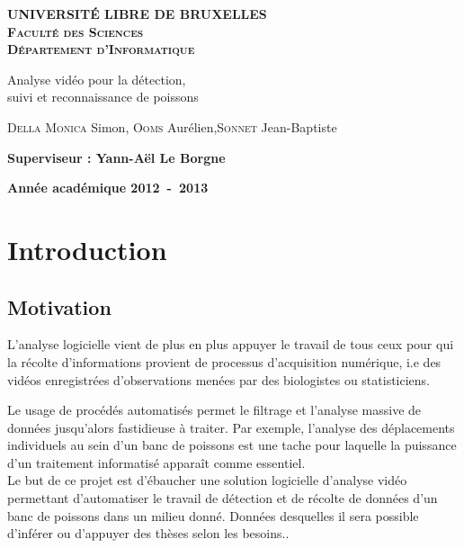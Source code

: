 \documentclass[a4paper,12pt]{report}
\begin{document}
\setlength\parindent{0pt} %


\begin{titlepage}
\begin{center}
\textbf{\textsc{UNIVERSIT\'E LIBRE DE BRUXELLES}}\\
\textbf{\textsc{Faculté des Sciences}}\\
\textbf{\textsc{Département d'Informatique}}
\vfill{}\vfill{}
\begin{center}{\Huge Analyse vidéo pour la détection, \\ suivi et reconnaissance de poissons}\end{center}{\Huge \par}
\begin{center}{\large \textsc{Della Monica} Simon, \textsc{Ooms} Aurélien,\textsc{Sonnet} Jean-Baptiste}\end{center}{\Huge \par}
\vfill{}\vfill{}
\begin{flushleft}{\large \textbf{Superviseur : Yann-A\"{e}l Le Borgne}}\hfill{}\end{flushleft}{\large\par}
\vfill{}\vfill{}\enlargethispage{3cm}
\textbf{Année académique 2012~-~2013}
\end{center}
\end{titlepage}




\tableofcontents
\newpage

\chapter{Introduction}


\section{Motivation}

L'analyse logicielle vient de plus en plus appuyer le travail de tous ceux pour qui la récolte d'informations provient de processus d'acquisition numérique, i.e des vidéos enregistrées d'observations menées par des biologistes ou statisticiens.
 
Le usage de procédés automatisés permet le filtrage et l'analyse massive de données jusqu'alors fastidieuse à traiter. Par exemple, l'analyse des déplacements individuels au sein d'un banc de poissons est une tache pour laquelle la puissance d'un traitement informatisé apparaît comme essentiel.\\
Le but de ce projet est d'ébaucher une solution logicielle d’analyse vidéo permettant d’automatiser le travail de détection et de récolte de données d'un banc de poissons dans un milieu donné. Données desquelles il sera possible d'inférer ou d'appuyer des thèses selon les besoins..
\end{document}
